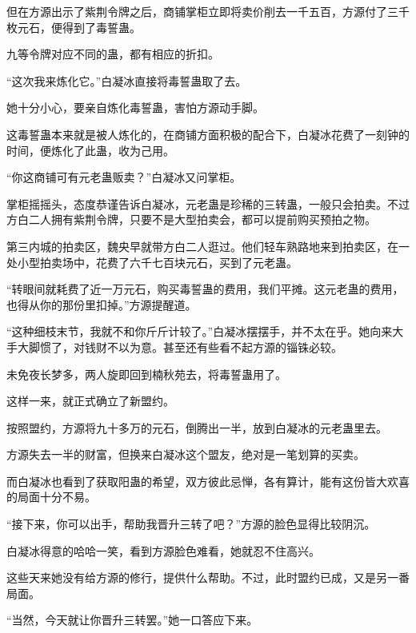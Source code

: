 \begin{this_body}
但在方源出示了紫荆令牌之后，商铺掌柜立即将卖价削去一千五百，方源付了三千枚元石，便得到了毒誓蛊。

九等令牌对应不同的蛊，都有相应的折扣。

“这次我来炼化它。”白凝冰直接将毒誓蛊取了去。

她十分小心，要亲自炼化毒誓蛊，害怕方源动手脚。

这毒誓蛊本来就是被人炼化的，在商铺方面积极的配合下，白凝冰花费了一刻钟的时间，便炼化了此蛊，收为己用。

“你这商铺可有元老蛊贩卖？”白凝冰又问掌柜。

掌柜摇摇头，态度恭谨告诉白凝冰，元老蛊是珍稀的三转蛊，一般只会拍卖。不过方白二人拥有紫荆令牌，只要不是大型拍卖会，都可以提前购买预拍之物。

第三内城的拍卖区，魏央早就带方白二人逛过。他们轻车熟路地来到拍卖区，在一处小型拍卖场中，花费了六千七百块元石，买到了元老蛊。

“转眼间就耗费了近一万元石，购买毒誓蛊的费用，我们平摊。这元老蛊的费用，也得从你的那份里扣掉。”方源提醒道。

“这种细枝末节，我就不和你斤斤计较了。”白凝冰摆摆手，并不太在乎。她向来大手大脚惯了，对钱财不以为意。甚至还有些看不起方源的锱铢必较。

未免夜长梦多，两人旋即回到楠秋苑去，将毒誓蛊用了。

这样一来，就正式确立了新盟约。

按照盟约，方源将九十多万的元石，倒腾出一半，放到白凝冰的元老蛊里去。

方源失去一半的财富，但换来白凝冰这个盟友，绝对是一笔划算的买卖。

而白凝冰也看到了获取阳蛊的希望，双方彼此忌惮，各有算计，能有这份皆大欢喜的局面十分不易。

“接下来，你可以出手，帮助我晋升三转了吧？”方源的脸色显得比较阴沉。

白凝冰得意的哈哈一笑，看到方源脸色难看，她就忍不住高兴。

这些天来她没有给方源的修行，提供什么帮助。不过，此时盟约已成，又是另一番局面。

“当然，今天就让你晋升三转罢。”她一口答应下来。

\end{this_body}


